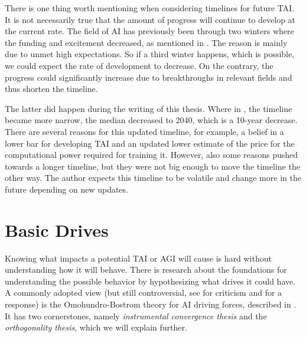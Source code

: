 \documentclass[12pt,A4]{report}
\theoremstyle{definition}
\begin{document}
There is one thing worth mentioning when considering timelines for future TAI. It is not necessarily true that the amount of progress will continue to develop at the current rate. The field of AI has previously been through two winters where the funding and excitement decreased, as mentioned in \citet[p.42]{RussellNorvig}. The reason is mainly due to unmet high expectations. So if a third winter happens, which is possible, we could expect the rate of development to decrease. On the contrary, the progress could significantly increase due to breakthroughs in relevant fields and thus shorten the timeline. 

The latter did happen during the writing of this thesis. Where in \citet{Cotra22}, the timeline became more narrow, the median decreased to 2040, which is a 10-year decrease. There are several reasons for this updated timeline, for example, a belief in a lower bar for developing TAI and an updated lower estimate of the price for the computational power required for training it. However, also some reasons pushed towards a longer timeline, but they were not big enough to move the timeline the other way. The author expects this timeline to be volatile and change more in the future depending on new updates. 


\section{Basic Drives}
Knowing what impacts a potential TAI or AGI will cause is hard without understanding how it will behave. There is research about the foundations for understanding the possible behavior by hypothesizing what drives it could have. A commonly adopted view (but still controversial, see \citet{MullerCannon} for criticism and \citet{Haggstrom21} for a response) is the Omohundro-Bostrom theory for AI driving forces, described in \citet{Haggstrom19}. It has two cornerstones, namely \textit{instrumental convergence thesis} and the \textit{orthogonality thesis}, which we will explain further.
\end{document}
